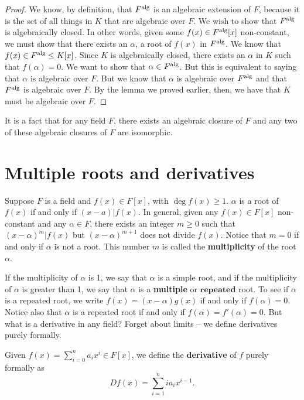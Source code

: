 \documentclass{../mathnotes}
\begin{document}
\begin{proof}
    We know, by definition, that $F^{\rm alg}$ is an algebraic extension of $F$, because it is the set of all things in $K$
    that are algebraic over $F$. We wish to show that $F^{\rm alg}$ is algebraically closed. In other words, given some 
    $f(x)\in F^{\rm alg}[x]$ non-constant, we must show that there exists an $\alpha$, a root of $f(x)$ in $F^{\rm alg}$.
    We know that $f(x)\in F^{\rm alg}\leq K[x]$. Since $K$ is algebraically closed, there exists an $\alpha$ in $K$ such that
    $f(\alpha)=0$. We want to show that $\alpha\in F^{\rm alg}$. But this is equivalent to saying that $\alpha$ is algebraic
    over $F$. But we know that $\alpha$ is algebraic over $F^{\rm alg}$ and that $F^{\rm alg}$ is algebraic over $F$. By the lemma
    we proved earlier, then, we have that $K$ must be algebraic over $F$.
\end{proof}

\begin{rem}
    It is a fact that for any field $F$, there exists an algebraic closure of $F$ and any two of these algebraic closures of $F$ are isomorphic.
\end{rem}

\section{Multiple roots and derivatives}

Suppose $F$ is a field and $f(x)\in F[x]$, with $\deg f(x)\geq 1$. $\alpha$ is a root of $f(x)$ if and only if $(x-a)|f(x)$.
In general, given any $f(x)\in F[x]$ non-constant and any $\alpha\in F$, there exists an integer $m\geq0$ such that $(x-\alpha)^m|f(x)$
but $(x-\alpha)^{m+1}$ does not divide $f(x)$. Notice that $m=0$ if and only if $\alpha$ is not a root. This number $m$ is called the
\textbf{multiplicity} of the root $\alpha$.

If the multiplicity of $\alpha$ is 1, we say that $\alpha$ is a simple root, and if the multiplicity of $\alpha$ is greater than 1, we say
that $\alpha$ is a \textbf{multiple} or $\textbf{repeated}$ root. To see if $\alpha$ is a repeated root, we write $f(x)=(x-\alpha)g(x)$
if and only if $f(\alpha)=0$. Notice also that $\alpha$ is a repeated root if and only if $f(\alpha)=f'(\alpha)=0$. But what is a derivative in
any field? Forget about limits -- we define derivatives purely formally.

\begin{defn}
    Given $f(x)=\sum_{i=0}^na_ix^i\in F[x]$, we define the \textbf{derivative} of $f$ purely formally as \[Df(x)=\sum_{i=1}^nia_ix^{i-1}.\]
\end{defn}
\end{document}
